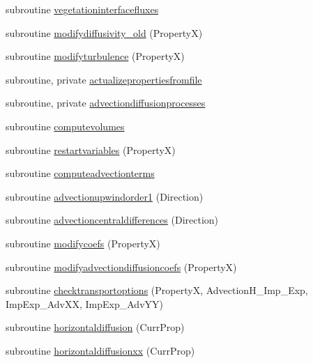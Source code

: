 \begin{DoxyCompactItemize}
\item 
subroutine \mbox{\hyperlink{namespacemodulerunoffproperties_ab3ab37be90febb6cff96da7ee7284955}{vegetationinterfacefluxes}}
\item 
subroutine \mbox{\hyperlink{namespacemodulerunoffproperties_ae867bca73f793abb9a8fe22800ea546c}{modifydiffusivity\+\_\+old}} (PropertyX)
\item 
subroutine \mbox{\hyperlink{namespacemodulerunoffproperties_a8f78696440cd79402c857e4191fd185e}{modifyturbulence}} (PropertyX)
\item 
subroutine, private \mbox{\hyperlink{namespacemodulerunoffproperties_a6cb9ce64b26164eb148aae403b3e9ab0}{actualizepropertiesfromfile}}
\item 
subroutine, private \mbox{\hyperlink{namespacemodulerunoffproperties_ae6b8378908b26858152e5bb2b1132217}{advectiondiffusionprocesses}}
\item 
subroutine \mbox{\hyperlink{namespacemodulerunoffproperties_aebcfa403a8c7338421febfe72507ff1e}{computevolumes}}
\item 
subroutine \mbox{\hyperlink{namespacemodulerunoffproperties_a0582858e9347f67d92588e44257918a3}{restartvariables}} (PropertyX)
\item 
subroutine \mbox{\hyperlink{namespacemodulerunoffproperties_a661de168b780c51098cc52f20f85f34b}{computeadvectionterms}}
\item 
subroutine \mbox{\hyperlink{namespacemodulerunoffproperties_a6a694f9a334a389bdaca97db0bbc2f7b}{advectionupwindorder1}} (Direction)
\item 
subroutine \mbox{\hyperlink{namespacemodulerunoffproperties_addd3719940508b59af78d352984c8274}{advectioncentraldifferences}} (Direction)
\item 
subroutine \mbox{\hyperlink{namespacemodulerunoffproperties_ab43247d321857ac09aa5d9ef97891cd1}{modifycoefs}} (PropertyX)
\item 
subroutine \mbox{\hyperlink{namespacemodulerunoffproperties_ae48417d5192871ed023a556976f13a89}{modifyadvectiondiffusioncoefs}} (PropertyX)
\item 
subroutine \mbox{\hyperlink{namespacemodulerunoffproperties_a5f610fc72802ac17615405bcd3f2f930}{checktransportoptions}} (PropertyX, Advection\+H\+\_\+\+Imp\+\_\+\+Exp, Imp\+Exp\+\_\+\+Adv\+XX, Imp\+Exp\+\_\+\+Adv\+YY)
\item 
subroutine \mbox{\hyperlink{namespacemodulerunoffproperties_af92ead42cead9acb2a8896534d8d3dfb}{horizontaldiffusion}} (Curr\+Prop)
\item 
subroutine \mbox{\hyperlink{namespacemodulerunoffproperties_aa14d5eb72e2b9e8e165bfbb537331410}{horizontaldiffusionxx}} (Curr\+Prop)

\end{DoxyCompactItemize}
